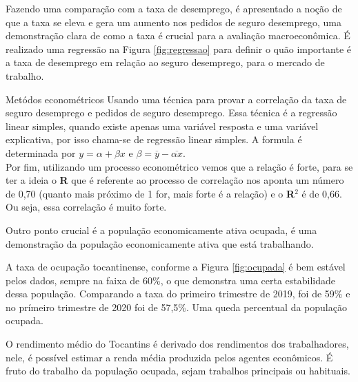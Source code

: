 \par Fazendo uma comparação com a taxa de desemprego, é apresentado a noção de que a taxa se eleva e gera um aumento nos pedidos de seguro desemprego, uma demonstração clara de como a taxa é crucial para a avaliação macroeconômica. É realizado uma regressão na Figura \ref{fig:regressao} para definir o quão importante é a taxa de desemprego em relação ao seguro desemprego, para o mercado de trabalho.

\begin{smbox}[label={labelbox},nameref={Desigualdade por gênero}]{Metódos econométricos}
	Usando uma técnica para provar a correlação da taxa de seguro desemprego e pedidos de seguro desemprego. Essa técnica é a regressão linear simples, quando existe apenas uma variável resposta e uma variável explicativa, por isso chama-se de regressão linear simples. A formula é determinada por $y = \alpha + \beta x$ e $\beta = \overline{y} - \overline{\alpha x}$.
	\\
	Por fim, utilizando um processo econométrico vemos que a relação é forte, para se ter a ideia o \textbf{R} que é referente ao processo de correlação nos aponta um número de 0,70 (quanto mais próximo de 1 for, mais forte é a relação) e o \textbf{R}$^{2}$ é de 0,66. Ou seja, essa correlação é muito forte.
\end{smbox}



\par Outro ponto crucial é a população economicamente ativa ocupada, é uma demonstração da população economicamente ativa que está trabalhando.



\par  A taxa de ocupação tocantinense, conforme a Figura \ref{fig:ocupada} é bem estável pelos dados, sempre na faixa de 60\%, o que demonstra uma certa estabilidade dessa população. Comparando a taxa do primeiro trimestre de 2019, foi de 59\% e no prímeiro trimestre de 2020 foi de 57,5\%. Uma queda percentual da população ocupada.



\par O rendimento médio do Tocantins é derivado dos rendimentos dos trabalhadores, nele, é possível estimar a renda média produzida pelos agentes econômicos. É fruto do trabalho da população ocupada, sejam trabalhos principais ou habituais.

